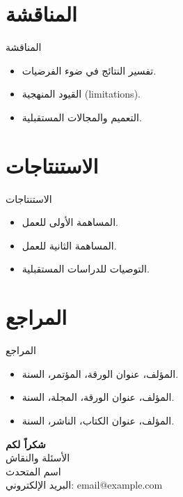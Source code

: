 \documentclass[aspectratio=169,11pt]{beamer}
\let\textEN\textenglish
\begin{document}
\section{المناقشة}
\begin{frame}{المناقشة}
\begin{itemize}
  \item تفسير النتائج في ضوء الفرضيات.
  \item القيود المنهجية \textEN{(limitations)}.
  \item التعميم والمجالات المستقبلية.
\end{itemize}
\end{frame}

\section{الاستنتاجات}
\begin{frame}{الاستنتاجات}
\begin{itemize}
  \item المساهمة الأولى للعمل.
  \item المساهمة الثانية للعمل.
  \item التوصيات للدراسات المستقبلية.
\end{itemize}
\end{frame}

\section{المراجع}
\begin{frame}{المراجع}
\begin{itemize}
  \item المؤلف، \textEN{عنوان الورقة}، المؤتمر، السنة.
  \item المؤلف، \textEN{عنوان الورقة}، المجلة، السنة.
  \item المؤلف، \textEN{عنوان الكتاب}، الناشر، السنة.
\end{itemize}
\end{frame}

\begin{frame}[plain]
\begin{center}
\vspace{1.5cm}
{\Huge\bfseries\color{accent} شكراً لكم}\\[1cm]
{\Large الأسئلة والنقاش}\\[0.8cm]
{\large اسم المتحدث}\\
{\normalsize البريد الإلكتروني: \textEN{email@example.com}}
\end{center}
\end{frame}
\end{document}
